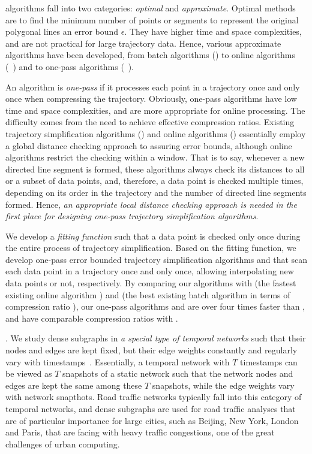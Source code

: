 \lsa algorithms fall into two categories: {\em optimal} and {\em approximate}.
Optimal methods\cite{Imai:Optimal} are to find the minimum number of points or segments to represent the original polygonal lines \wrt an error bound $\epsilon$. They have higher time and space complexities, and are not practical for large trajectory data.
Hence,  various approximate \lsa algorithms have been developed, from batch algorithms (\eg \cite{Douglas:Peucker}) to online algorithms (\eg~\cite{Liu:BQS}) and to one-pass algorithms (\eg~\cite{LinMZWH17}).


An \lsa algorithm is {\em one-pass} if it processes each point in a trajectory once and only once when compressing the trajectory.
Obviously, one-pass algorithms have low time and space complexities, and are more appropriate for online processing. The difficulty comes from the need to achieve effective compression ratios.
Existing trajectory simplification algorithms (\eg \cite{Douglas:Peucker}) and online algorithms  (\eg \cite{Liu:BQS}) essentially employ a global distance checking approach to assuring error bounds, although online algorithms restrict the checking within a window. That is to say, whenever a new directed line segment is formed, these algorithms always check its distances to all or a subset of data points, and, therefore, a data point is checked multiple times, depending on its order in the trajectory and the number of directed line segments formed. Hence, {\em an appropriate local distance checking approach is needed in the first place for designing one-pass trajectory simplification algorithms}.

 We develop a  {\em fitting function} such that a data point is checked only once during the entire process of trajectory simplification. Based on the fitting function, we develop one-pass error bounded trajectory simplification algorithms \operb and \operba that scan each data point in a trajectory once and only once, allowing interpolating new data points or not, respectively. By comparing our algorithms with \fbqsa (the fastest existing \lsa online algorithm \cite{Liu:BQS}) and \dpa (the best existing \lsa batch algorithm in terms of compression ratio \cite{Douglas:Peucker}), our one-pass algorithms  \operb and \operba are over four times faster than \fbqsa, and have  comparable compression ratios with \dpa.


.  We study dense subgraphs in {\em a special type of temporal networks} such that their nodes and edges are kept fixed, but their edge weights constantly and regularly vary with timestamps~\cite{MaHWLH17}.  Essentially, a temporal network with $T$ timestamps can be viewed as $T$ snapshots of a static network such that the network nodes and edges are kept the same among these $T$ snapshots, while the edge weights vary with network snapthots. Road traffic networks typically fall into this category of temporal networks, and dense subgraphs are used for road traffic analyses that are of particular importance for large cities, such as Beijing, New York, London and Paris, that are facing with heavy traffic congestions, one of the great challenges of urban computing.

